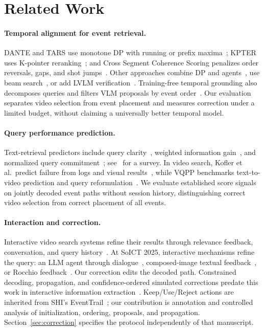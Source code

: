 \section{Related Work}
\label{sec:related_work}

\paragraph{Temporal alignment for event retrieval.}
DANTE and TARS use monotone DP with running or prefix maxima~\cite{luu2025dante,do2025tars}; KPTER uses K-pointer reranking~\cite{dinh2025kpter}; and Cross Segment Coherence Scoring penalizes order reversals, gaps, and shot jumps~\cite{nguyen2025cscs}.
Other approaches combine DP and agents~\cite{nguyen2025agentdp}, use beam search~\cite{vu2025madtempo}, or add LVLM verification~\cite{ho2025lucifertrace}.
Training-free temporal grounding also decomposes queries and filters VLM proposals by event order~\cite{zheng2024tfvtg}.
Our evaluation separates video selection from event placement and measures correction under a limited budget, without claiming a universally better temporal model.

\paragraph{Query performance prediction.}
Text-retrieval predictors include query clarity~\cite{cronen2002predicting}, weighted information gain~\cite{zhou2007wig}, and normalized query commitment~\cite{shtok2012nqc}; see~\cite{carmel2010difficulty} for a survey.
In video search, Kofler et al.\ predict failure from logs and visual results~\cite{kofler2012failure}, while VQPP benchmarks text-to-video prediction and query reformulation~\cite{lutu2026vqpp}.
We evaluate established score signals on jointly decoded event paths without session history, distinguishing correct video selection from correct placement of all events.

\paragraph{Interaction and correction.}
Interactive video search systems refine their results through relevance feedback, conversation, and query history~\cite{khan2024exquisitor,sharma2025exquisitor,ma2022ivcmr}.
At SoICT 2025, interactive mechanisms refine the query: an LLM agent through dialogue~\cite{mai2025conversational}, composed-image textual feedback~\cite{to2025cirfeedback}, or Rocchio feedback~\cite{nguyen2025vortex}.
Our correction edits the decoded path.
Constrained decoding, propagation, and confidence-ordered simulated corrections predate this work in interactive information extraction~\cite{kristjansson2004constrained}.
Keep/Use/Reject actions are inherited from SHI's EventTrail~\cite{nguyen2027shi}; our contribution is annotation and controlled analysis of initialization, ordering, proposals, and propagation.
Section~\ref{sec:correction} specifies the protocol independently of that manuscript.
